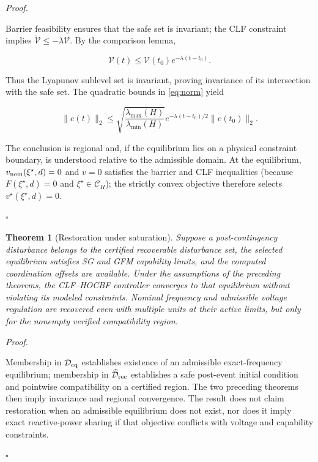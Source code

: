 \documentclass[11pt,twocolumn]{article}
\newtheorem{theorem}{Theorem}
\newenvironment{proof}{\par\noindent\textit{Proof.}\ }{\hfill$\square$\par}
\begin{document}
\begin{proof}

Barrier feasibility ensures that the safe set is invariant; the CLF constraint implies $\dot{\mathcal V}\leq-\lambda\mathcal V$. By the comparison lemma,

\begin{equation}\label{eq:expV}
\mathcal V(t)\leq\mathcal V(t_0)e^{-\lambda(t-t_0)}.
\end{equation}

Thus the Lyapunov sublevel set is invariant, proving invariance of its intersection with the safe set. The quadratic bounds in \eqref{eq:norm} yield

\begin{equation}\label{eq:expnorm}
\|e(t)\|_2\leq\sqrt{\frac{\lambda_{\max}(H)}{\lambda_{\min}(H)}}
 e^{-\lambda(t-t_0)/2}\|e(t_0)\|_2.
\end{equation}

The conclusion is regional and, if the equilibrium lies on a physical constraint boundary, is understood relative to the admissible domain. At the equilibrium, $v_{\rm nom}(\xi^\star,d)=0$ and $v=0$ satisfies the barrier and CLF inequalities (because $F(\xi^\star,d)=0$ and $\xi^\star\in\mathcal C_H$); the strictly convex objective therefore selects $v^\star(\xi^\star,d)=0$.

\end{proof}

\begin{theorem}[Restoration under saturation]

Suppose a post-contingency disturbance belongs to the certified recoverable disturbance set, the selected equilibrium satisfies SG and GFM capability limits, and the computed coordination offsets are available. Under the assumptions of the preceding theorems, the CLF--HOCBF controller converges to that equilibrium without violating its modeled constraints. Nominal frequency and admissible voltage regulation are recovered even with multiple units at their active limits, but only for the nonempty verified compatibility region.

\end{theorem}

\begin{proof}

Membership in $\mathcal D_{\rm eq}$ establishes existence of an admissible exact-frequency equilibrium; membership in $\widehat{\mathcal D}_{\rm rec}$ establishes a safe post-event initial condition and pointwise compatibility on a certified region. The two preceding theorems then imply invariance and regional convergence. The result does not claim restoration when an admissible equilibrium does not exist, nor does it imply exact reactive-power sharing if that objective conflicts with voltage and capability constraints.

\end{proof}
\end{document}
